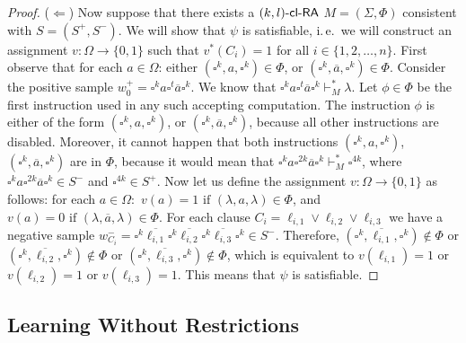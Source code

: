 \begin{proof}
($\Leftarrow$)
Now suppose that there exists a $\mbox{\sf $(k,l)$-\mbox{\sf cl-RA\/}}$ $M = (\Sigma, \Phi)$ consistent
with $S = (S^+, S^-)$. We will show that 
$\psi$ is satisfiable, i.\,e.\ we will construct an assignment
$v: \Omega \to \{0, 1\}$ such that $v^*(C_i) = 1$ for all $i \in \{1, 2, \ldots, n\}$.
First observe that for each $a \in \Omega$: either $(\square^k, a, \square^k) \in \Phi$,
or $(\square^k, \overline{a}, \square^k) \in \Phi$. Consider the positive sample
$w_0^+ = \square^k a \square^t \overline{a} \square^k$. 
We know that $\square^k a \square^t \overline{a} \square^k \vdash_M^* \lambda$.
Let $\phi \in \Phi$ be the first instruction used in any such accepting computation.
The instruction $\phi$ is either of the form $(\square^k, a, \square^k)$,
or $(\square^k, \overline{a}, \square^k)$, because all other instructions
are disabled. Moreover, it cannot happen that both instructions
$(\square^k, a, \square^k)$, $(\square^k, \overline{a}, \square^k)$ are in $\Phi$, because
it would mean that 
$\square^k a \square^{2k} \overline{a} \square^k \vdash_M^* \square^{4k}$, 
where $\square^k a \square^{2k} \overline{a} \square^k \in S^-$ and 
$\square^{4k} \in S^+$.
Now let us define the assignment $v: \Omega \to \{0, 1\}$ as follows:
for each $a \in \Omega:$ $v(a) = 1 \text{ if } (\lambda, a, \lambda) \in \Phi$,
and $v(a) = 0 \text{ if } (\lambda, \overline{a}, \lambda) \in \Phi$.
For each clause $C_i = \ell_{i,1} \vee \ell_{i,2} \vee \ell_{i,3}$ we have
a negative sample 
$w_{C_i}^- = \square^k \overline{\ell_{i,1}} \square^k \overline{\ell_{i,2}} 
\square^k \overline{\ell_{i,3}} \square^k \in S^-$.
Therefore, 
$(\square^k, \overline{\ell_{i,1}}, \square^k) \notin \Phi$ or
$(\square^k, \overline{\ell_{i,2}}, \square^k) \notin \Phi$ or
$(\square^k, \overline{\ell_{i,3}}, \square^k) \notin \Phi$,
which is equivalent to $v(\ell_{i,1}) = 1$ or $v(\ell_{i,2}) = 1$ or $v(\ell_{i,3}) = 1$.
This means that $\psi$ is satisfiable.
\end{proof}

\subsection{Learning Without Restrictions}\label{section:unrestricted-learning}

